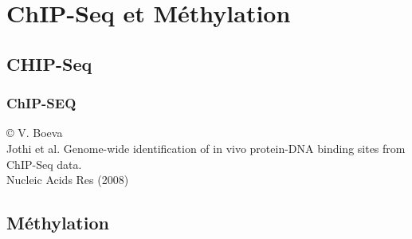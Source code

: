 \documentclass{beamer}
\begin{document}




\section{ChIP-Seq et Méthylation} %
\label{sec:capture_et_chip_seq}

\subsection{CHIP-Seq} %
\begin{frame}
	\frametitle{ChIP-SEQ}
		\tiny{© V. Boeva}\\
		\tiny{Jothi et al. Genome-wide identification of in vivo protein-DNA binding sites from ChIP-Seq data.\\ Nucleic Acids Res (2008)}
\end{frame}


\subsection{Méthylation} %
\label{sub:méthylation}
\end{document}
